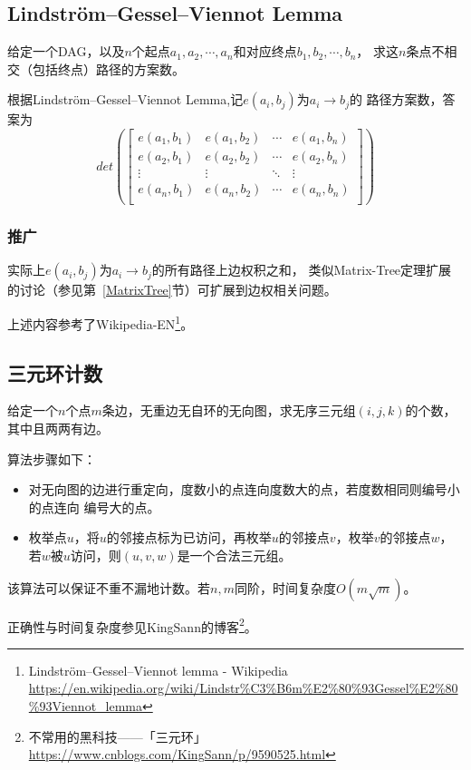 \subsection{Lindström–Gessel–Viennot Lemma}
给定一个DAG，以及$n$个起点$a_1,a_2,\cdots,a_n$和对应终点$b_1,b_2,\cdots,b_n$，
求这$n$条点不相交（包括终点）路径的方案数。

根据Lindström–Gessel–Viennot Lemma,记$e(a_i,b_j)$为$a_i\rightarrow b_j$的
路径方案数，答案为\begin{displaymath}
	det\left(\left[\begin{array}{cccc}
			e(a_1,b_1) & e(a_1,b_2) & \cdots & e(a_1,b_n) \\
			e(a_2,b_1) & e(a_2,b_2) & \cdots & e(a_2,b_n) \\
			\vdots     & \vdots     & \ddots & \vdots     \\
			e(a_n,b_1) & e(a_n,b_2) & \cdots & e(a_n,b_n) \\
		\end{array}\right]\right)
\end{displaymath}
\subsubsection{推广}
实际上$e(a_i,b_j)$为$a_i\rightarrow b_j$的所有路径上边权积之和，
类似Matrix-Tree定理扩展的讨论（参见第~\ref{MatrixTree}节）可扩展到边权相关问题。

上述内容参考了Wikipedia-EN\footnote{
	Lindström–Gessel–Viennot lemma - Wikipedia
	\url{https://en.wikipedia.org/wiki/Lindstr\%C3\%B6m\%E2\%80\%93Gessel\%E2\%80\%93Viennot\_lemma}
}。
\subsection{三元环计数}
给定一个$n$个点$m$条边，无重边无自环的无向图，求无序三元组$(i,j,k)$的个数，其中且两两有边。

算法步骤如下：
\begin{itemize}
	\item 对无向图的边进行重定向，度数小的点连向度数大的点，若度数相同则编号小的点连向
	编号大的点。
	\item 枚举点$u$，将$u$的邻接点标为已访问，再枚举$u$的邻接点$v$，枚举$v$的邻接点$w$，
	若$w$被$u$访问，则$(u,v,w)$是一个合法三元组。
\end{itemize}

该算法可以保证不重不漏地计数。若$n,m$同阶，时间复杂度$O(m\sqrt{m})$。

正确性与时间复杂度参见KingSann的博客\footnote{
	不常用的黑科技——「三元环」
	\url{https://www.cnblogs.com/KingSann/p/9590525.html}
}。
